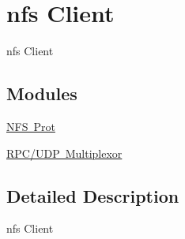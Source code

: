 \hypertarget{group__nfsclient}{}\section{nfs Client}
\label{group__nfsclient}


nfs Client  


\subsection*{Modules}
\begin{DoxyCompactItemize}
\item 
\mbox{\hyperlink{group__libfs__nfsclient__nfs__prot}{N\+F\+S Prot}}
\item 
\mbox{\hyperlink{group__rtems-nfsclient}{R\+P\+C/\+U\+D\+P Multiplexor}}
\end{DoxyCompactItemize}


\subsection{Detailed Description}
nfs Client 

